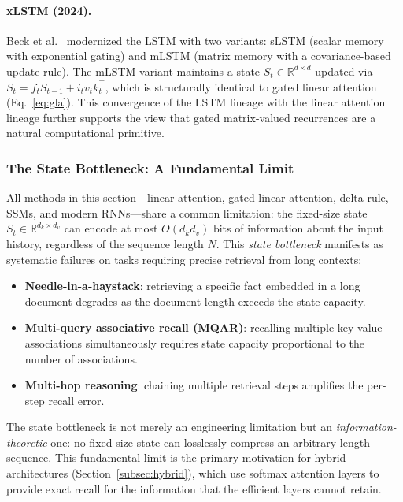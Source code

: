 \documentclass[11pt,a4paper]{article}
\begin{document}
\paragraph{xLSTM (2024).}
Beck et al.~\cite{beck2024xlstm} modernized the LSTM with two variants: sLSTM (scalar memory with exponential gating) and mLSTM (matrix memory with a covariance-based update rule). The mLSTM variant maintains a state $S_t \in \mathbb{R}^{d \times d}$ updated via $S_t = f_t S_{t-1} + i_t v_t k_t^\top$, which is structurally identical to gated linear attention (Eq.~\ref{eq:gla}). This convergence of the LSTM lineage with the linear attention lineage further supports the view that gated matrix-valued recurrences are a natural computational primitive.

\subsubsection{The State Bottleneck: A Fundamental Limit}

All methods in this section---linear attention, gated linear attention, delta rule, SSMs, and modern RNNs---share a common limitation: the fixed-size state $S_t \in \mathbb{R}^{d_k \times d_v}$ can encode at most $O(d_k d_v)$ bits of information about the input history, regardless of the sequence length $N$. This \emph{state bottleneck} manifests as systematic failures on tasks requiring precise retrieval from long contexts:
\begin{itemize}[nosep]
\item \textbf{Needle-in-a-haystack}: retrieving a specific fact embedded in a long document degrades as the document length exceeds the state capacity.
\item \textbf{Multi-query associative recall (MQAR)}: recalling multiple key-value associations simultaneously requires state capacity proportional to the number of associations.
\item \textbf{Multi-hop reasoning}: chaining multiple retrieval steps amplifies the per-step recall error.
\end{itemize}
The state bottleneck is not merely an engineering limitation but an \emph{information-theoretic} one: no fixed-size state can losslessly compress an arbitrary-length sequence. This fundamental limit is the primary motivation for hybrid architectures (Section~\ref{subsec:hybrid}), which use softmax attention layers to provide exact recall for the information that the efficient layers cannot retain.


\end{document}
